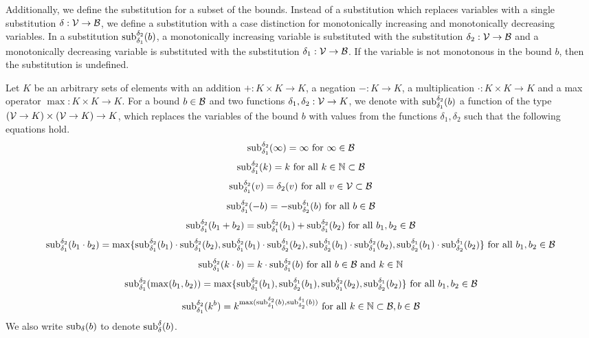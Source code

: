 Additionally, we define the substitution for a subset of the bounds.
Instead of a substitution which replaces variables with a single substitution $\delta: \VSet \rightarrow \BoundSet$, we define a substitution with a case distinction for monotonically increasing and monotonically decreasing variables.
In a substitution $\apprsubst{b}{\delta_1}{\delta_2}$, a monotonically increasing variable is substituted with the substitution $\delta_2: \VSet \rightarrow \BoundSet$ and a monotonically decreasing variable is substituted with the substitution $\delta_1: \VSet \rightarrow \BoundSet$.
If the variable is not monotonous in the bound $b$, then the substitution is undefined.
\begin{definition}
  Let $K$ be an arbitrary sets of elements with an addition $+: K \times K \rightarrow K$, a negation $-: K \rightarrow K$, a multiplication $\cdot: K \times K \rightarrow K$ and a max operator $\max: K \times K \rightarrow K$.
  For a bound $b \in \BoundSet$ and two functions $\delta_1, \delta_2: \VSet \rightarrow K$, we denote with $\apprsubst{b}{\delta_1}{\delta_2}$ a function of the type $(\VSet \rightarrow K) \times (\VSet \rightarrow K) \rightarrow K$, which replaces the variables of the bound $b$ with values from the functions $\delta_1, \delta_2$ such that the following equations hold.
  \[ \apprsubst{\infty}{\delta_1}{\delta_2} = \infty \text{ for } \infty \in \BoundSet \]
  \[ \apprsubst{k}{\delta_1}{\delta_2} = k \text{ for all } k \in \mathbb{N} \subset \BoundSet \] 
  \[ \apprsubst{v}{\delta_1}{\delta_2} = \delta_2(v) \text{ for all } v \in \VSet \subset \BoundSet \] 
  \[ \apprsubst{-b}{\delta_1}{\delta_2} = -\apprsubst{b}{\delta_2}{\delta_1} \text{ for all } b \in \BoundSet \] 
  \[ \apprsubst{b_1 + b_2}{\delta_1}{\delta_2} = \apprsubst{b_1}{\delta_1}{\delta_2} + \apprsubst{b_2}{\delta_1}{\delta_2} \text{ for all } b_1, b_2 \in \BoundSet \] 
  \[ \apprsubst{b_1 \cdot b_2}{\delta_1}{\delta_2} = \maximum{
    \apprsubst{b_1}{\delta_1}{\delta_2} \cdot \apprsubst{b_2}{\delta_1}{\delta_2},
    \apprsubst{b_1}{\delta_1}{\delta_2} \cdot \apprsubst{b_2}{\delta_2}{\delta_1},
    \apprsubst{b_1}{\delta_2}{\delta_1} \cdot \apprsubst{b_2}{\delta_1}{\delta_2},
    \apprsubst{b_1}{\delta_2}{\delta_1} \cdot \apprsubst{b_2}{\delta_2}{\delta_1}
  } \text{ for all } b_1, b_2 \in \BoundSet \] 
  \[ \apprsubst{k \cdot b}{\delta_1}{\delta_2} = k \cdot \apprsubst{b}{\delta_1}{\delta_2} \text{ for all } b \in \BoundSet \text{ and } k \in \mathbb{N} \] 
  \[ \apprsubst{\max(b_1, b_2)}{\delta_1}{\delta_2} = \maximum{\apprsubst{b_1}{\delta_1}{\delta_2}, \apprsubst{b_1}{\delta_2}{\delta_1}, \apprsubst{b_2}{\delta_1}{\delta_2}, \apprsubst{b_2}{\delta_2}{\delta_1}} \text{ for all } b_1, b_2 \in \BoundSet \]
  \[ \apprsubst{k^b}{\delta_1}{\delta_2} = k^{\max(\apprsubst{b}{\delta_1}{\delta_2}, \apprsubst{b}{\delta_2}{\delta_1})} \text{ for all } k \in \mathbb{N} \subset \BoundSet, b \in \BoundSet \]  
  We also write $\exactsubst{b}{\delta}$ to denote $\apprsubst{b}{\delta}{\delta}$.
\end{definition}

